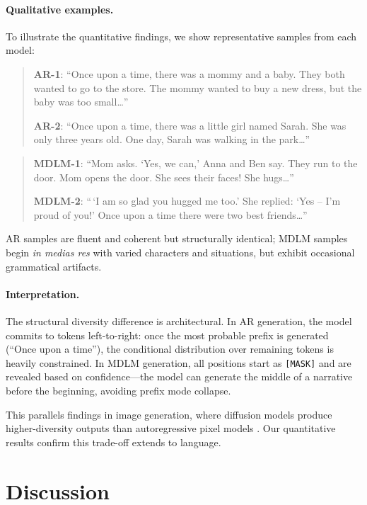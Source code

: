 \documentclass[11pt,a4paper]{article}
\begin{document}
\paragraph{Qualitative examples.}
To illustrate the quantitative findings, we show representative samples from each model:

\begin{quote}
\small
\textbf{AR-1}: ``Once upon a time, there was a mommy and a baby. They both wanted to go to the store. The mommy wanted to buy a new dress, but the baby was too small\ldots''

\textbf{AR-2}: ``Once upon a time, there was a little girl named Sarah. She was only three years old. One day, Sarah was walking in the park\ldots''
\end{quote}

\begin{quote}
\small
\textbf{MDLM-1}: ``Mom asks. `Yes, we can,' Anna and Ben say. They run to the door. Mom opens the door. She sees their faces! She hugs\ldots''

\textbf{MDLM-2}: ``\,`I am so glad you hugged me too.' She replied: `Yes -- I'm proud of you!' Once upon a time there were two best friends\ldots''
\end{quote}

AR samples are fluent and coherent but structurally identical; MDLM samples begin \emph{in medias res} with varied characters and situations, but exhibit occasional grammatical artifacts.

\paragraph{Interpretation.}
The structural diversity difference is architectural.
In AR generation, the model commits to tokens left-to-right: once the most probable prefix is generated (``Once upon a time''), the conditional distribution over remaining tokens is heavily constrained.
In MDLM generation, all positions start as \texttt{[MASK]} and are revealed based on confidence---the model can generate the middle of a narrative before the beginning, avoiding prefix mode collapse.

This parallels findings in image generation, where diffusion models produce higher-diversity outputs than autoregressive pixel models \citep{ho2020ddpm}. Our quantitative results confirm this trade-off extends to language.

\section{Discussion}
\end{document}
